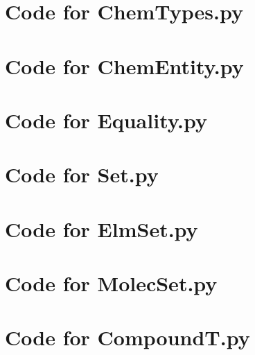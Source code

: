 \documentclass[12pt]{article}
\begin{document}
\def\thesection{\Alph{section}}

\section{Code for ChemTypes.py}

\noindent 

\newpage

\section{Code for ChemEntity.py}

\noindent 

\newpage

\section{Code for Equality.py}

\noindent 

\newpage

\section{Code for Set.py}

\noindent 

\newpage

\section{Code for ElmSet.py}

\noindent 

\newpage

\section{Code for MolecSet.py}

\noindent 

\newpage

\section{Code for CompoundT.py}

\noindent 
\end{document}
